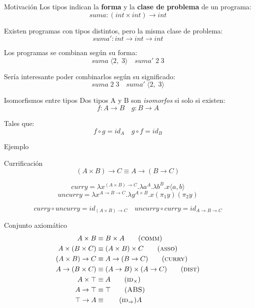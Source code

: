 \begin{frame}{Motivación}
	Los tipos indican la \textbf{forma} y la \textbf{clase de problema} de un programa:
	\pause
	\[ suma : (int \times int) \rightarrow int \]
	
	\pause
	Existen programas con tipos distintos, pero la misma clase de problema:
	\[ suma' : int \rightarrow int \rightarrow int \]
	
	\pause
	Los programas se combinan según su forma:
	\[ suma \;\langle2,\; 3\rangle \quad suma'\; 2\; 3 \]
	
	\pause
	Sería interesante poder combinarlos según su significado:
	\[ suma\; 2\; 3 \quad suma' \;\langle2,\; 3\rangle \]
\end{frame}

\begin{frame}{Isomorfismos entre tipos}
	Dos tipos A y B son \textit{isomorfos} si solo si existen:
	\[ f: A \rightarrow B \quad g: B \rightarrow A \]
	
	\pause
	
	Tales que:
	\[ f \circ g = id_A \quad g \circ f = id_B \]
\end{frame}

\begin{frame}{Ejemplo}
	\begin{exampleblock}{Currificación}
		\[ (A \times B) \rightarrow C \equiv A \rightarrow (B \rightarrow C) \]
		
		\pause
		\[ curry = \lambda x^{(A \times B) \rightarrow C}. \lambda a^A . \lambda b^B . x\langle a,b \rangle \]
		\[ uncurry = \lambda x^{A \rightarrow B \rightarrow C}. \lambda y^{A \times B} . x(\pi_1 y)(\pi_2 y) \]
		
		\pause
		\[ curry \circ uncurry = id_{(A \times B) \rightarrow C} \quad
		uncurry \circ curry = id_{A \rightarrow B \rightarrow C} \]
	\end{exampleblock}
\end{frame}

\begin{frame}{Conjunto axiomático}
	\begin{align*}
		A \times B &\equiv B \times A \tag{\textsc{comm}} \\
		A \times (B \times C) &\equiv (A \times B) \times C \tag{\textsc{asso}} \\
		(A \times B) \rightarrow C &\equiv A \rightarrow (B \rightarrow C) \tag{\textsc{curry}} \\
		A \rightarrow (B \times C) &\equiv (A \rightarrow B) \times (A \rightarrow C) \tag{\textsc{dist}} \\
		A \times \top &\equiv A \tag{\textsc{id$_\times$}} \\
		A \rightarrow \top &\equiv \top \tag{\textsc{ABS}} \\
		\top \rightarrow A &\equiv \tag{\textsc{id$_\Rightarrow$}} A
	\end{align*}
\end{frame}

